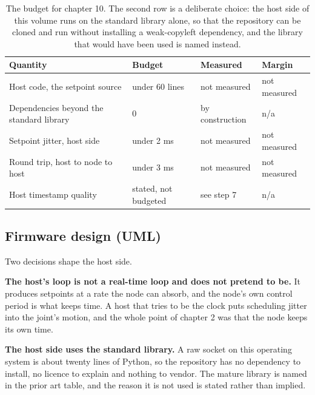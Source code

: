 \begin{table}[H]\centering\small
\begin{tabular}{p{44mm}p{28mm}p{28mm}p{30mm}}
\toprule
Quantity & Budget & Measured & Margin \\
\midrule
Host code, the setpoint source & under 60 lines & not measured & not measured \\
Dependencies beyond the standard library & 0 & by construction & n/a \\
Setpoint jitter, host side & under 2 ms & not measured & not measured \\
Round trip, host to node to host & under 3 ms & not measured & not measured \\
Host timestamp quality & stated, not budgeted & see step 7 & n/a \\
\bottomrule
\end{tabular}
\caption{The budget for chapter 10. The second row is a deliberate choice: the host side of this volume runs on the standard library alone, so that the repository can be cloned and run without installing a weak-copyleft dependency, and the library that would have been used is named instead.}
\end{table}

\subsection*{Firmware design (UML)}


Two decisions shape the host side.

\textbf{The host's loop is not a real-time loop and does not pretend to be.} It
produces setpoints at a rate the node can absorb, and the node's own control
period is what keeps time. A host that tries to be the clock puts scheduling
jitter into the joint's motion, and the whole point of chapter 2 was that the
node keeps its own time.

\textbf{The host side uses the standard library.} A raw socket on this operating
system is about twenty lines of Python, so the repository has no dependency to
install, no licence to explain and nothing to vendor. The mature library is
named in the prior art table, and the reason it is not used is stated rather
than implied.

